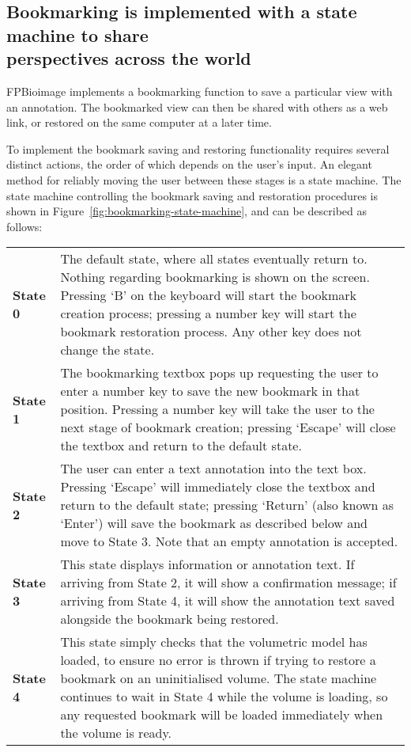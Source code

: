 \subsection[Bookmarking is implemented with a state machine to share perspectives across the world]{Bookmarking is implemented with a state machine to share\\ perspectives across the world}
FPBioimage implements a bookmarking function to save a particular view with an annotation.
The bookmarked view can then be shared with others as a web link, or restored on the same computer at a later time.

To implement the bookmark saving and restoring functionality requires several distinct actions, the order of which depends on the user's input.
An elegant method for reliably moving the user between these stages is a state machine.
The state machine controlling the bookmark saving and restoration procedures is shown in Figure~\ref{fig:bookmarking-state-machine}, and can be described as follows:
\begin{tabular}{>{\bfseries}l p{}}
State 0 & The default state, where all states eventually return to. Nothing regarding bookmarking is shown on the screen. Pressing `B' on the keyboard will start the bookmark creation process; pressing a number key will start the bookmark restoration process. Any other key does not change the state. \\
State 1 & The bookmarking textbox pops up requesting the user to enter a number key to save the new bookmark in that position. Pressing a number key will take the user to the next stage of bookmark creation; pressing `Escape' will close the textbox and return to the default state. \\
State 2 & The user can enter a text annotation into the text box. Pressing `Escape' will immediately close the textbox and return to the default state; pressing `Return' (also known as `Enter') will save the bookmark as described below and move to State 3. Note that an empty annotation is accepted. \\
State 3 & This state displays information or annotation text. If arriving from State 2, it will show a confirmation message; if arriving from State 4, it will show the annotation text saved alongside the bookmark being restored. \\
State 4 & This state simply checks that the volumetric model has loaded, to ensure no error is thrown if trying to restore a bookmark on an uninitialised volume. The state machine continues to wait in State 4 while the volume is loading, so any requested bookmark will be loaded immediately when the volume is ready. \\
\end{tabular}


